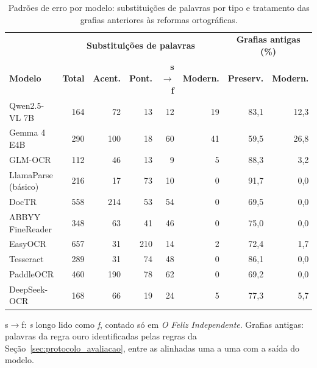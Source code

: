 \begin{table}[htb]
\centering
\caption{Padrões de erro por modelo: substituições de palavras por tipo e tratamento
das grafias anteriores às reformas ortográficas.}
\label{tab:erros_resumo}
\renewcommand{\arraystretch}{1.25}
{\small
\begin{tabular}{l r r r r r r r}
\hline
& \multicolumn{5}{c}{\textbf{Substituições de palavras}} & \multicolumn{2}{c}{\textbf{Grafias antigas (\%)}} \\
\textbf{Modelo} & \textbf{Total} & \textbf{Acent.} & \textbf{Pont.} & \textbf{s$\to$f} & \textbf{Modern.} & \textbf{Preserv.} & \textbf{Modern.} \\
\hline
Qwen2.5-VL 7B & 164 & 72 & 13 & 12 & 19 & 83,1 & 12,3 \\
Gemma 4 E4B & 290 & 100 & 18 & 60 & 41 & 59,5 & 26,8 \\
GLM-OCR & 112 & 46 & 13 & 9 & 5 & 88,3 & 3,2 \\
LlamaParse (básico) & 216 & 17 & 73 & 10 & 0 & 91,7 & 0,0 \\
DocTR & 558 & 214 & 53 & 54 & 0 & 69,5 & 0,0 \\
ABBYY FineReader & 348 & 63 & 41 & 46 & 0 & 75,0 & 0,0 \\
EasyOCR & 657 & 31 & 210 & 14 & 2 & 72,4 & 1,7 \\
Tesseract & 289 & 31 & 74 & 48 & 0 & 86,1 & 0,0 \\
PaddleOCR & 460 & 190 & 78 & 62 & 0 & 69,2 & 0,0 \\
DeepSeek-OCR & 168 & 66 & 19 & 24 & 5 & 77,3 & 5,7 \\
\hline
\end{tabular}
}
\par\footnotesize{s$\to$f: \textit{s} longo lido como \textit{f}, contado só em \textit{O Feliz Independente}.
Grafias antigas: palavras da regra ouro identificadas pelas regras da Seção~\ref{sec:protocolo_avaliacao},
entre as alinhadas uma a uma com a saída do modelo.}
\end{table}
